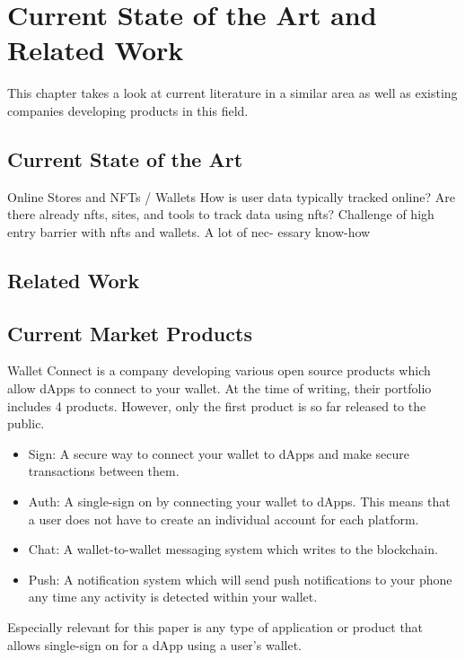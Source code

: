 \chapter{Current State of the Art and Related Work}
\label{ch:SOTA}
This chapter takes a look at current literature in a similar area as well as existing companies developing products in this field.

%
%
\section{Current State of the Art}
\label{sec:sota:stateOfTheArt}

Online Stores and NFTs / Wallets
How is user data typically tracked online? 
Are there already nfts, sites, and tools to track data using nfts? 
Challenge of high entry barrier with nfts and wallets. A lot of nec- essary know-how 


%
%
\section{Related Work}
\label{sec:sota:relatedWork}


%
%
\section{Current Market Products}
\label{sec:sota:products}
Wallet Connect \cite{walletConnect} is a company developing various open source products which allow dApps to connect to your wallet. At the time of writing, their portfolio includes 4 products. However, only the first product is so far released to the public.
\begin{itemize}
	\item Sign: A secure way to connect your wallet to dApps and make secure transactions between them. \cite{walletConnect}
	\item Auth: A single-sign on by connecting your wallet to dApps. This means that a user does not have to create an individual account for each platform. \cite{walletConnect}
	\item Chat: A wallet-to-wallet messaging system which writes to the blockchain. \cite{walletConnect}
	\item Push: A notification system which will send push notifications to your phone any time any activity is detected within your wallet. \cite{walletConnect}
\end{itemize}

Especially relevant for this paper is any type of application or product that allows single-sign on for a dApp using a user's wallet.
